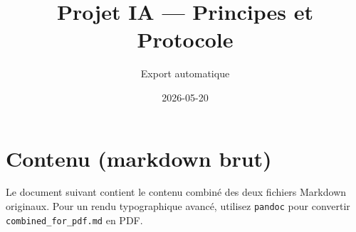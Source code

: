 \documentclass[12pt]{article}
\title{Projet IA — Principes et Protocole}
\author{Export automatique}
\date{2026-05-20}
\begin{document}
\maketitle
\clearpage
\section*{Contenu (markdown brut)}
Le document suivant contient le contenu combiné des deux fichiers Markdown originaux. Pour un rendu typographique avancé, utilisez \texttt{pandoc} pour convertir \texttt{combined_for_pdf.md} en PDF.
\bigskip
{}
\end{document}
